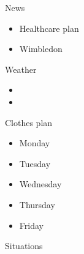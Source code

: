 \documentclass[serif, mathserif, final]{beamer}
\begin{document}
\begin{frame}
\begin{columns}
    \begin{column}{0.20\linewidth}
      \begin{block}{News}
        \begin{itemize}   
          \tiny \item \tiny Healthcare plan 
        \item \tiny Wimbledon 
        \end{itemize}
      \end{block}
      \begin{block}{Weather} 
        \begin{itemize}
          \tiny \item \tiny 
        \item \tiny 
        \end{itemize}
      \end{block} 
      \begin{block}{Clothes plan} 
        \begin{itemize} 
          \tiny \item \tiny Monday
        \item \tiny Tuesday
        \item \tiny Wednesday
        \item \tiny Thursday
        \item \tiny Friday
        \end{itemize} 
      \end{block}

      \begin{block}{Situations}


\end{block}
\end{column}
\end{columns}
\end{frame}
\end{document}
